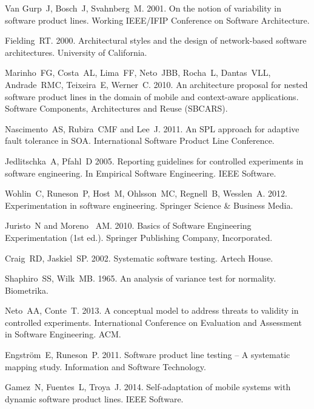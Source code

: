 \documentclass{kais}
\begin{document}
\begin{thebibliography}{99}
 Van Gurp~J, Bosch~J, Svahnberg~M. 2001. On the notion of variability in software product lines. Working IEEE/IFIP Conference on Software Architecture.

 Fielding~RT. 2000. Architectural styles and the design of network-based software architectures. University of California.

 Marinho~FG, Costa~AL, Lima~FF, Neto~JBB, Rocha~L, Dantas~VLL, Andrade~RMC, Teixeira~E, Werner~C. 2010. An architecture proposal for nested software product lines in the domain of mobile and context-aware applications. Software Components, Architectures and Reuse (SBCARS).

 Nascimento~AS, Rubira~CMF and Lee~J. 2011. An SPL approach for adaptive fault tolerance in SOA. International Software Product Line Conference.

 Jedlitschka~A, Pfahl~D 2005. Reporting guidelines for controlled experiments in software engineering. In Empirical Software Engineering. IEEE Software.

 Wohlin~C, Runeson~P, Host~M, Ohlsson~MC, Regnell~B, Wesslen~A. 2012. Experimentation in software engineering. Springer Science \& Business Media.

 Juristo~N and Moreno~ AM. 2010. Basics of Software Engineering Experimentation (1st ed.). Springer Publishing Company, Incorporated.

 Craig~RD, Jaskiel~SP. 2002. Systematic software testing. Artech House.

 Shaphiro~SS, Wilk~MB. 1965. An analysis of variance test for normality. Biometrika.

 Neto~AA, Conte~T. 2013. A conceptual model to address threats to validity in controlled experiments. International Conference on Evaluation and Assessment in Software Engineering. ACM.

 Engstr\"{o}m~E, Runeson~P. 2011. Software product line testing -- A systematic mapping study. Information and Software Technology.

 Gamez~N, Fuentes~L, Troya~J. 2014. Self-adaptation of mobile systems with dynamic software product lines. IEEE Software.


\end{thebibliography}
\end{document}
